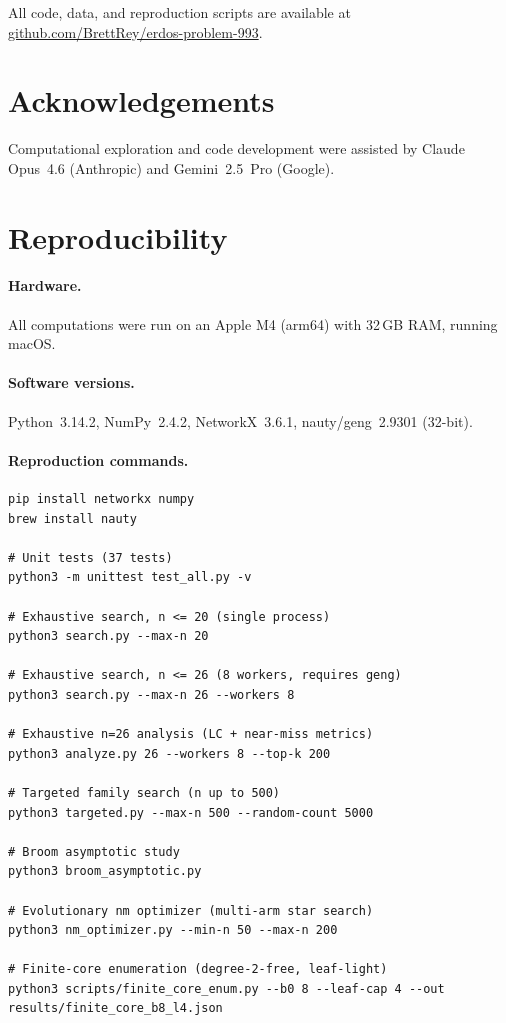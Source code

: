 \documentclass[12pt,oneside]{article}
\theoremstyle{remark}
\begin{document}
All code, data, and reproduction scripts are available at
\href{https://github.com/BrettRey/erdos-problem-993}{github.com/BrettRey/\allowbreak erdos-problem-993}.


\section*{Acknowledgements}

Computational exploration and code development were assisted by Claude Opus~4.6 (Anthropic) and Gemini~2.5~Pro (Google).

\appendix

\section{Reproducibility}\label{app:repro}

\paragraph*{Hardware.}
All computations were run on an Apple M4 (arm64) with 32\,GB RAM, running macOS.

\paragraph*{Software versions.}
Python~3.14.2, NumPy~2.4.2, NetworkX~3.6.1, nauty/geng~2.9301 (32-bit).

\paragraph*{Reproduction commands.}
\begin{verbatim}
pip install networkx numpy
brew install nauty

# Unit tests (37 tests)
python3 -m unittest test_all.py -v

# Exhaustive search, n <= 20 (single process)
python3 search.py --max-n 20

# Exhaustive search, n <= 26 (8 workers, requires geng)
python3 search.py --max-n 26 --workers 8

# Exhaustive n=26 analysis (LC + near-miss metrics)
python3 analyze.py 26 --workers 8 --top-k 200

# Targeted family search (n up to 500)
python3 targeted.py --max-n 500 --random-count 5000

# Broom asymptotic study
python3 broom_asymptotic.py

# Evolutionary nm optimizer (multi-arm star search)
python3 nm_optimizer.py --min-n 50 --max-n 200

# Finite-core enumeration (degree-2-free, leaf-light)
python3 scripts/finite_core_enum.py --b0 8 --leaf-cap 4 --out results/finite_core_b8_l4.json
\end{verbatim}
\end{document}
